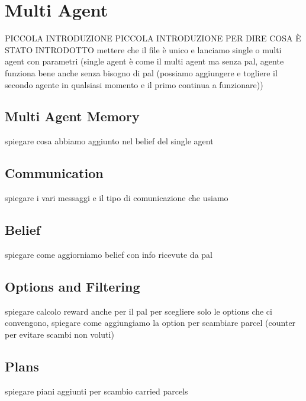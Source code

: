 \section{Multi Agent}

    PICCOLA INTRODUZIONE
    PICCOLA INTRODUZIONE PER DIRE COSA È STATO INTRODOTTO
    mettere che il file è unico e lanciamo single o multi agent con parametri (single agent è come il multi agent ma senza pal, agente funziona bene anche senza bisogno di pal (possiamo aggiungere e togliere il secondo agente in qualsiasi momento e il primo continua a funzionare))

    \subsection{Multi Agent Memory}
        spiegare cosa abbiamo aggiunto nel belief del single agent

    \subsection{Communication}
        spiegare i vari messaggi e il tipo di comunicazione che usiamo

    \subsection{Belief}
        spiegare come aggiorniamo belief con info ricevute da pal

    \subsection{Options and Filtering}
        spiegare calcolo reward anche per il pal per scegliere solo le options che ci convengono, spiegare come aggiungiamo la option per scambiare parcel (counter per evitare scambi non voluti)

    \subsection{Plans}
        spiegare piani aggiunti per scambio carried parcels 
        